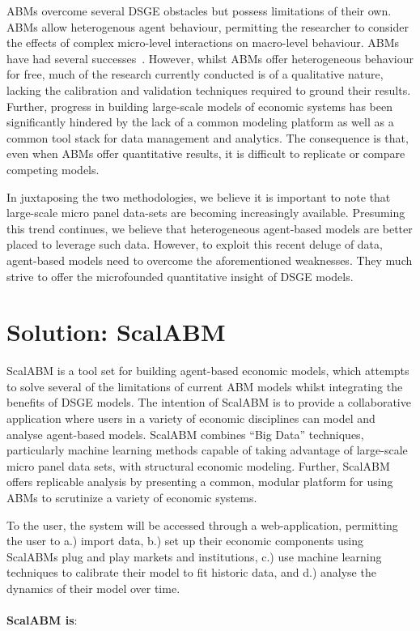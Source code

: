 \documentclass[a4paper]{article}
\begin{document}
ABMs overcome several DSGE obstacles but possess limitations of their own. ABMs allow heterogenous agent behaviour, permitting the researcher to consider the effects of complex micro-level interactions on macro-level behaviour. ABMs have had several successes~\citep{Klimek2015144,Poledna2014199,Deissenberg2008541,Schelling1971}. However, whilst ABMs offer heterogeneous behaviour for free, much of the research currently conducted is of a qualitative nature, lacking the calibration and validation techniques required to ground their results. Further, progress in building large-scale models of economic systems has been significantly hindered by the lack of a common modeling platform as well as a common tool stack for data management and analytics. The consequence is that, even when ABMs offer quantitative results, it is difficult to replicate or compare competing models.

In juxtaposing the two methodologies, we believe it is important to note that large-scale micro panel data-sets are becoming increasingly available. Presuming this trend continues, we believe that heterogeneous agent-based models are better placed to leverage such data. However, to exploit this recent deluge of data, agent-based models need to overcome the aforementioned weaknesses. They much strive to offer the microfounded quantitative insight of DSGE models.

\section{Solution: ScalABM}

ScalABM is a tool set for building agent-based economic models, which attempts to solve several of the limitations of current ABM models whilst integrating the benefits of DSGE models. The intention of ScalABM is to provide a collaborative application where users in a variety of economic disciplines can model and analyse agent-based models. ScalABM combines ``Big Data'' techniques, particularly machine learning methods capable of taking advantage of large-scale micro panel data sets, with structural economic modeling. Further, ScalABM offers replicable analysis by presenting a common, modular platform for using ABMs to scrutinize a variety of economic systems.

To the user, the system will be accessed through a web-application, permitting the user to a.) import data, b.) set up their economic components using ScalABMs plug and play markets and institutions, c.) use machine learning techniques to calibrate their model to fit historic data, and d.) analyse the dynamics of their model over time.
\\
\\
\textbf{ScalABM is}:
\end{document}
